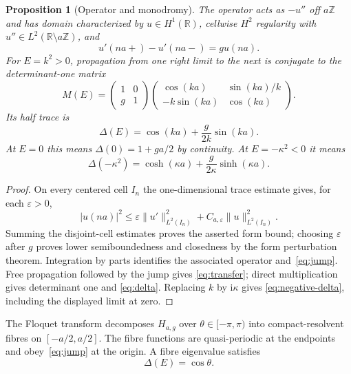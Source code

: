 \documentclass[10pt]{article}
\newtheorem{proposition}[theorem]{Proposition}
\newcommand{\iu}{\mathrm{i}}
\newcommand{\R}{\mathbb R}
\begin{document}
\begin{proposition}[Operator and monodromy]\label{prop:owner}
The operator acts as $-u''$ off $a\mathbb Z$ and has domain characterized by
$u\in H^1(\R)$, cellwise $H^2$ regularity with
$u''\in L^2(\R\setminus a\mathbb Z)$, and
\begin{equation}\label{eq:jump}
 u'(na+)-u'(na-)=g u(na).
\end{equation}
For $E=k^2>0$, propagation from one right limit to the next is conjugate to
the determinant-one matrix
\begin{equation}\label{eq:transfer}
 M(E)=(\begin{matrix}1&0\\g&1\end{matrix})
 (\begin{matrix}\cos(ka)&\sin(ka)/k\\-k\sin(ka)&\cos(ka)\end{matrix}).
\end{equation}
Its half trace is
\begin{equation}\label{eq:delta}
 \Delta(E)=\cos(ka)+\frac{g}{2k}\sin(ka).
\end{equation}
At $E=0$ this means $\Delta(0)=1+ga/2$ by continuity.  At
$E=-\kappa^2<0$ it means
\begin{equation}\label{eq:negative-delta}
 \Delta(-\kappa^2)=\cosh(\kappa a)
       +\frac{g}{2\kappa}\sinh(\kappa a).
\end{equation}
\end{proposition}
\begin{proof}
On every centered cell $I_n$ the one-dimensional trace estimate gives, for
each $\varepsilon>0$,
\[
 |u(na)|^2\leq \varepsilon\|u'\|_{L^2(I_n)}^2
                 +C_{a,\varepsilon}\|u\|_{L^2(I_n)}^2.
\]
Summing the disjoint-cell estimates proves the asserted form bound; choosing
$\varepsilon$ after $g$ proves lower semiboundedness and closedness by the
form perturbation theorem.  Integration by parts identifies the associated
operator and~\eqref{eq:jump}.  Free propagation followed by the jump gives
\eqref{eq:transfer}; direct multiplication gives determinant one and
\eqref{eq:delta}.  Replacing $k$ by $\iu\kappa$ gives
\eqref{eq:negative-delta}, including the displayed limit at zero.
\end{proof}

The Floquet transform decomposes $H_{a,g}$ over
$\theta\in[-\pi,\pi)$ into compact-resolvent fibres on
$[-a/2,a/2]$.  The fibre functions are quasi-periodic at the endpoints and
obey~\eqref{eq:jump} at the origin.  A fibre eigenvalue satisfies
\begin{equation}\label{eq:floquet}
 \Delta(E)=\cos\theta.
\end{equation}
\end{document}

